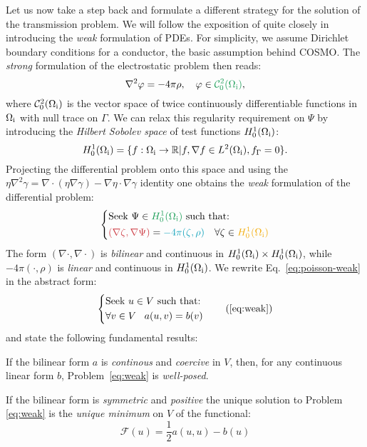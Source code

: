 Let us now take a step back and formulate a different strategy for the
solution of the transmission problem.
We will follow the exposition of \citeauthor{Ern2004-oo} quite closely
in introducing the \emph{weak} formulation of \acp{PDE}.
For simplicity, we assume Dirichlet boundary conditions for a conductor,
\ie the basic assumption behind \acrshort{COSMO}.
The \emph{strong} formulation of the electrostatic problem then reads:
\begin{equation}\label{eq:poisson-cosmo}
  \nabla^2\esp = -4\pi\rho,
  \quad \esp \in \mathcolor{ForestGreen}{\mathcal{C}^2_0(\Omegai)},
\end{equation}
where $\mathcal{C}^2_0(\Omega_\mathrm{i})$ is the vector space of twice
continuously differentiable functions in $\Omega_\mathrm{i}$ with null trace on
$\Gamma$.
We can relax this regularity requirement on $\Psi$ by introducing the
\emph{Hilbert Sobolev space} of test functions $H_0^1(\Omega_\mathrm{i})$:
\begin{equation}
  H_0^1(\Omega_\mathrm{i}) = \lbrace
  f : \Omega_\mathrm{i} \rightarrow \mathbb{R}
  | f, \nabla f \in L^2(\Omega_\mathrm{i}), f_\Gamma = 0
  \rbrace.
\end{equation}
Projecting the differential problem onto this space and using the
$\eta\nabla^2\gamma = \nabla\cdot(\eta\nabla\gamma) - \nabla\eta\cdot\nabla\gamma$ identity
one obtains the \emph{weak} formulation of the differential problem:
\begin{equation}\label{eq:poisson-weak}
  \left\{
  \begin{aligned}
    &\text{Seek $\Psi \in \mathcolor{ForestGreen}{H_0^1(\Omegai)}$ such that:}\\
    &\mathcolor{PMS1797}{(\nabla\zeta, \nabla\Psi)} =
    \mathcolor{PMS2229}{-4\pi(\zeta, \rho)} \quad
    \forall \zeta\in \mathcolor{PMS130}{H_0^1(\Omegai)}
  \end{aligned}
  \right.
\end{equation}
The form $(\nabla\cdot, \nabla\cdot)$ is \emph{bilinear} and continuous
in $H_0^1(\Omega_\mathrm{i})\times H_0^1(\Omega_\mathrm{i})$, while $-4\pi(\cdot, \rho)$ is
\emph{linear} and continuous in $H_0^1(\Omega_\mathrm{i})$.
We rewrite Eq.~\eqref{eq:poisson-weak} in the abstract form:
\begin{equation}
  \left\{
  \begin{aligned}
    &\text{Seek $u \in V$ such that:}\\
    &\forall v \in V \,\,\,\,\,
    a(u, v) = b(v)
  \end{aligned}
  \right.
  \tag{\ref{eq:weak}}
\end{equation}
and state the following fundamental results:
\begin{lemma}
  If the bilinear form $a$ is \emph{continous} and \emph{coercive}
  in $V$, then, for any continuous linear form $b$, Problem~\eqref{eq:weak} is
  \emph{well-posed}.
\end{lemma}
\begin{corollary}
  If the bilinear form is \emph{symmetric} and \emph{positive}
  the unique solution to Problem \eqref{eq:weak} is
  the \emph{unique minimum} on $V$ of the functional:
  \[
  \mathcal{F}(u) = \frac{1}{2}a(u, u) - b(u)
  \]
\end{corollary}

